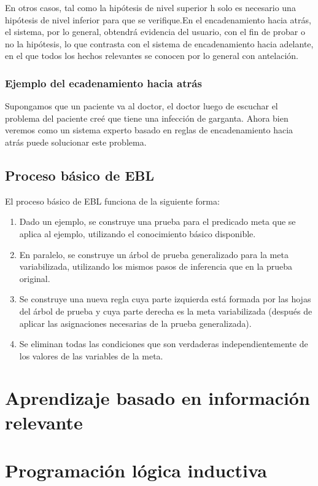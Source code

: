 \documentclass[12 pt, a4paper]{article}
\begin{document}
			En otros casos, tal como la hipótesis de nivel superior h solo es necesario una hipótesis de nivel inferior para que se verifique.En el encadenamiento hacia atrás, el sistema, por lo general, obtendrá evidencia del usuario, con el fin de probar o no la hipótesis, lo que contrasta con el sistema de encadenamiento hacia adelante, en el que todos los hechos relevantes se conocen por lo general con antelación.
			\subsubsection{Ejemplo del ecadenamiento hacia atrás}
			Supongamos que un paciente va al doctor, el doctor luego de escuchar el problema del paciente creé que tiene una infección de garganta. Ahora bien veremos como un sistema experto basado en reglas de encadenamiento hacia atrás puede solucionar este problema.
			
			\subsection{Proceso básico de EBL}
			El proceso básico de EBL funciona de la siguiente forma:
				\begin{enumerate}
						\item Dado un ejemplo, se construye una prueba para el predicado meta que se aplica al ejemplo, utilizando el conocimiento básico disponible.\\
						  \item En paralelo, se construye un árbol de prueba generalizado para la meta variabilizada, utilizando los mismos pasos de inferencia que en la prueba original.\\
						  \item Se construye una nueva regla cuya parte izquierda está formada por las hojas del árbol de prueba y cuya parte derecha es la meta variabilizada (después de aplicar las asignaciones necesarias de la prueba generalizada).\\
						  \item Se eliminan todas las condiciones que son verdaderas independientemente de los valores de las variables de la meta.\\
				\end{enumerate}

	 \section{Aprendizaje basado en información relevante}
	
	 \section{Programación lógica inductiva}
	 
\end{document}
